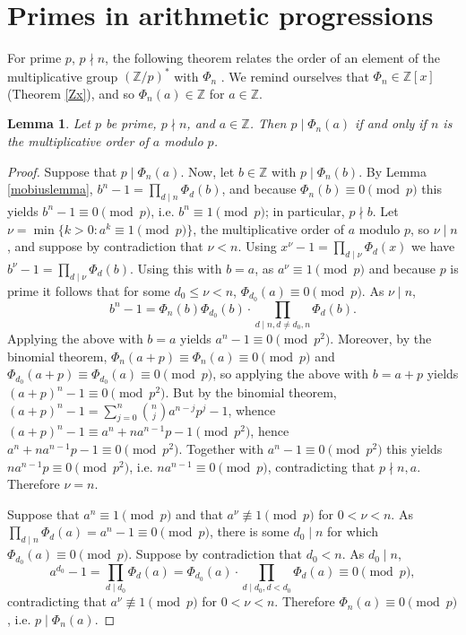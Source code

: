\documentclass{amsart}
\newtheorem{lemma}[theorem]{Lemma}
\theoremstyle{definition}
\begin{document}
\section{Primes in arithmetic progressions}
For prime $p$, $p \nmid n$, the following theorem
relates the order of an element of the multiplicative group $(\mathbb{Z}/p)^*$ 
with $\Phi_n$ \cite[p.~13, Lemma 2.9]{washington}.
We remind ourselves that $\Phi_n \in \mathbb{Z}[x]$ (Theorem \ref{Zx}), and so
$\Phi_n(a) \in \mathbb{Z}$ for $a \in \mathbb{Z}$.

\begin{lemma}
Let $p$ be prime, $p  \nmid n$, and $a \in \mathbb{Z}$. Then $p \mid \Phi_n(a)$ if and only if
$n$ is the multiplicative order of $a$ modulo $p$.
\label{multiplicativeorder}
\end{lemma}
\begin{proof}
Suppose that $p \mid \Phi_n(a)$. Now, let
$b \in \mathbb{Z}$ with 
 $p \mid \Phi_n(b)$. By Lemma \ref{mobiuslemma}, 
$b^n-1 = \prod_{d \mid n} \Phi_d(b)$,
and because $\Phi_n(b) \equiv 0 \pmod{p}$ this yields
$b^n-1 \equiv 0 \pmod{p}$, i.e. $b^n \equiv 1 \pmod{p}$; in particular, $p \nmid b$.
Let $\nu = \min \{k > 0: a^k \equiv 1 \pmod{p}\}$, the multiplicative order of $a$ modulo $p$, so $\nu \mid n$, and
suppose by contradiction that $\nu<n$. Using $x^\nu - 1 = \prod_{d \mid \nu} \Phi_d(x)$ we have
$b^\nu - 1 = \prod_{d \mid \nu} \Phi_d(b)$.
Using this with $b=a$, as $a^\nu \equiv 1 \pmod{p}$ and because $p$ is prime it follows
that for some $d_0 \leq \nu < n$, $\Phi_{d_0}(a) \equiv 0 \pmod{p}$. As $\nu \mid n$, 
\[
b^n-1 = \Phi_n(b) \Phi_{d_0}(b)  \cdot \prod_{d \mid n, d \neq d_0, n} \Phi_d(b).
\]
Applying the above with $b=a$ yields $a^n-1 \equiv 0 \pmod{p^2}$. 
Moreover, by the binomial theorem, $\Phi_n(a+p) \equiv \Phi_n(a) \equiv 0 \pmod{p}$ and
$\Phi_{d_0}(a+p) \equiv \Phi_{d_0}(a) \equiv 0 \pmod{p}$, so applying the above with $b=a+p$ yields
$(a+p)^n - 1 \equiv 0 \pmod{p^2}$.
But by the binomial theorem, $(a+p)^n -1 = \sum_{j=0}^n \binom{n}{j} a^{n-j} p^j - 1$, whence
$(a+p)^n - 1 \equiv a^n + na^{n-1}p - 1 \pmod{p^2}$,
hence $a^n + na^{n-1}p -1 \equiv 0 \pmod{p^2}$.
Together with $a^n-1 \equiv 0 \pmod{p^2}$ this yields
$na^{n-1}p \equiv 0 \pmod{p^2}$, i.e. $na^{n-1} \equiv 0 \pmod{p}$, contradicting that $p \nmid n, a$. 
Therefore $\nu = n$.

Suppose that $a^n \equiv 1 \pmod{p}$ and that $a^\nu \not \equiv 1 \pmod{p}$ for $0<\nu<n$. 
As $ \prod_{d \mid n} \Phi_d(a) = a^n - 1 \equiv 0 \pmod{p}$, 
there is some $d_0 \mid n$ for which $\Phi_{d_0}(a) \equiv 0 \pmod{p}$. Suppose by contradiction that
$d_0<n$. As $d_0 \mid n$,
\[
a^{d_0}-1 = \prod_{d \mid d_0} \Phi_d(a) = \Phi_{d_0}(a) \cdot \prod_{d \mid d_0, d<d_0} \Phi_d(a) \equiv 0 \pmod{p},
\]
contradicting that $a^\nu \not \equiv 1 \pmod{p}$ for $0<\nu<n$. Therefore $\Phi_n(a) \equiv 0 \pmod{p}$, i.e.
$p \mid \Phi_n(a)$.
\end{proof}
\end{document}
